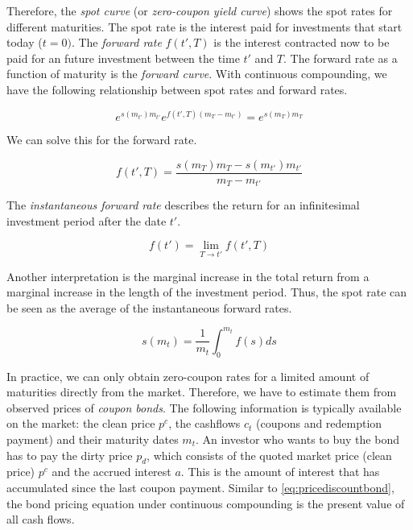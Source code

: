Therefore, the \emph{spot curve} (or \emph{zero-coupon yield curve}) shows the spot rates for different maturities. The spot rate is the interest paid for investments that start today ($t=0)$. The \emph{forward rate} $f(t',T)$ is the interest contracted now to be paid for an future investment between the time $t'$ and $T$. The forward rate as a function of maturity is the \emph{forward curve}. With continuous compounding, we have the following relationship between spot rates and forward rates.

\begin{equation*}
  \label{eq:relspotforward}
  e^{s(m_{t'}) m_{t'}}e^{f(t',T)(m_T-m_{t'})} = e^{s(m_T) m_T}
\end{equation*}

We can solve this for the forward rate.

\begin{equation*}
  \label{eq:forwardrate}
  f(t',T) = \frac{s(m_T)m_T - s(m_{t'})m_{t'}}{m_T-m_{t'}}
\end{equation*}

The \emph{instantaneous forward rate} describes the return for an infinitesimal investment period after the date $t'$.

\begin{equation*}
  \label{eq:instforw}
  f(t') = \lim_{T\rightarrow t'}f(t',T)
\end{equation*}

Another interpretation is the marginal increase in the total return from a marginal increase in the length of the investment period. Thus, the spot rate can be seen as the average of the instantaneous forward rates.

\begin{equation}
  \label{eq:avgforwardrate}
  s(m_t)=\frac{1}{m_t}\int_0^{m_t}f(s)ds
\end{equation}

In practice, we can only obtain zero-coupon rates for a limited amount of maturities directly from the market. Therefore, we have to estimate them from observed prices of \emph{coupon bonds}. The following information is typically available on the market: the clean price $p^c$, the cashflows $c_t$ (coupons and redemption payment) and their maturity dates $m_t$. An investor who wants to buy the bond has to pay the dirty price $p_d$, which consists of the quoted market price (clean price) $p^c$ and the accrued interest $a$. This is the amount of interest that has accumulated since the last coupon payment. Similar to \eqref{eq:pricediscountbond}, the bond pricing equation under continuous compounding is the present value of all cash flows.

